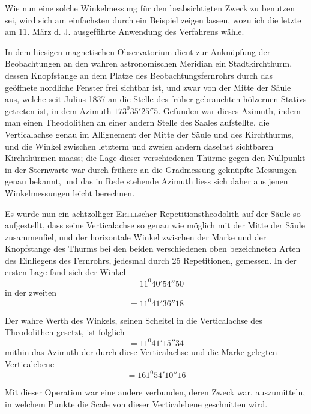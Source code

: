 Wie nun eine solche Winkelmessung für den beabsichtigten Zweck zu benutzen sei, wird sich am einfachsten durch ein Beispiel zeigen lassen, wozu ich die letzte am 11. März d. J. ausgeführte Anwendung des Verfahrens wähle.

In dem hiesigen magnetischen Observatorium dient zur Anknüpfung der Beobachtungen an den wahren astronomischen Meridian ein Stadtkirchthurm, dessen Knopfstange an dem Platze des Beobachtungsfernrohrs durch das geöffnete nordliche Fenster frei sichtbar ist, und zwar von der Mitte der Säule aus, welche seit Julius 1837 an die Stelle des früher gebrauchten hölzernen Stativs getreten ist, in dem Azimuth $173^0 35'25''5$. Gefunden war dieses Azimuth, indem man einen Theodolithen an einer andern Stelle des Saales aufstellte, die Verticalachse genau im Allignement der Mitte der Säule und des Kirchthurms, und die Winkel zwischen letzterm und zweien andern daselbst sichtbaren Kirchthürmen maass; die Lage dieser verschiedenen Thürme gegen den Nullpunkt in der Sternwarte war durch frühere an die Gradmessung geknüpfte Messungen genau bekannt, und das in Rede stehende Azimuth liess sich daher aus jenen Winkelmessungen leicht berechnen.

Es wurde nun ein achtzolliger \textsc{Ertel}scher Repetitionstheodolith auf der Säule so aufgestellt, dass seine Verticalachse so genau wie möglich mit der Mitte der Säule zusammenfiel, und der horizontale Winkel zwischen der Marke und der Knopfstange des Thurms bei den beiden verschiedenen oben bezeichneten Arten des Einliegens des Fernrohrs, jedesmal durch 25 Repetitionen, gemessen. In der ersten Lage fand sich der Winkel
\[
=11^0 40'54''50
\]
in der zweiten
\[
=11^0 41'36''18
\]

Der wahre Werth des Winkels, seinen Scheitel in die Verticalachse des Theodolithen gesetzt, ist folglich
\[
=11^0 41'15''34
\]
mithin das Azimuth der durch diese Verticalachse und die Marke gelegten Verticalebene
\[
=161^0 54'10''16
\]

Mit dieser Operation war eine andere verbunden, deren Zweck war, auszumitteln, in welchem Punkte die Scale von dieser Verticalebene geschnitten wird.

